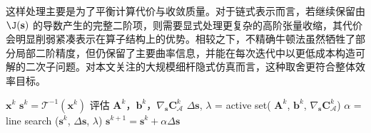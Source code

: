 这样处理主要是为了平衡计算代价与收敛质量。对于链式表示而言，若继续保留由 $\J(\mathbf{s})$ 的导数产生的完整二阶项，则需要显式处理更复杂的高阶张量收缩，其代价会明显削弱紧凑表示在算子结构上的优势。相较之下，不精确牛顿法虽然牺牲了部分局部二阶精度，但仍保留了主要曲率信息，并能在每次迭代中以更低成本构造可解的二次子问题。对本文关注的大规模细杆隐式仿真而言，这种取舍更符合整体效率目标。
\begin{algorithm}
\caption{SQP 框架}\label{alg: nonlinear_solver}
\begin{algorithmic}
\REQUIRE $\mathbf{x}^k$
\STATE $\mathbf{s}^k = \mathcal{T}^{-1}(\mathbf{x}^k)$
   \STATE 评估 $\mathbf{A}^k$，$\mathbf{b}^k$，$\nabla_{\mathbf{s}}\mathbf{C}_{\mathcal A}^k$
   \STATE $\Delta {\mathbf{s}}$, $\lambda$ = active set( $\mathbf{A}^k$, $\mathbf{b}^k$, $\nabla_{\mathbf{s}}\mathbf{C}_{\mathcal A}^k$)
   \STATE $\alpha$ = line search ($\mathbf{s}^k$, $\Delta \mathbf{s}$, $\lambda$)
   \STATE ${\mathbf{s}}^{k+1} = {\mathbf{s}}^k + \alpha \Delta {\mathbf{s}}$
\ENDWHILE
\end{algorithmic}
\end{algorithm}

